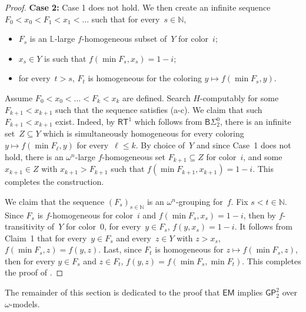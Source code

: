 \documentclass{article}
\numberwithin{theorem}{section}
\newtheorem{lemma}[theorem]{Lemma}
\def\LL{\mathbb{L}}
\def\L{\mathcal{L}}
\newcommand{\BSig}{\mathsf{B}\Sigma^0}
\newcommand{\EM}[0]{\mathsf{EM}}
\newcommand{\RT}[0]{\mathsf{RT}}
\newcommand{\GP}{\mathsf{GP}}
\newcommand{\NN}[0]{\mathbb{N}}
\begin{document}
\begin{proof}
\smallskip
\textbf{Case 2:} Case 1 does not hold. We then create an infinite sequence $F_0 < x_0 < F_1 < x_1 < \dots$ such that for every~$s \in \NN$,
\begin{itemize}
    \item[(a)] $F_s$ is an $\LL$-large $f$-homogeneous subset of~$Y$ for color~$i$;
    \item[(b)] $x_s \in Y$ is such that $f(\min F_s, x_s) = 1-i$;
    \item[(c)] for every~$t > s$, $F_t$ is homogeneous for the coloring $y \mapsto f(\min F_s, y)$.
\end{itemize}
Assume $F_0 < x_0 < \dots < F_k < x_k$ are defined. Search $H$-computably for some~$F_{k+1} < x_{k+1}$ such that the sequence satisfies (a-c). We claim that such $F_{k+1} < x_{k+1}$ exist. Indeed, by $\RT^1$ which follows from $\BSig_2$, there is an infinite set~$Z \subseteq Y$ which is simultaneously homogeneous for every coloring $y \mapsto f(\min F_\ell, y)$ for every~$\ell \leq k$. By choice of~$Y$ and since Case~1 does not hold, there is an $\omega^n$-large $f$-homogeneous set $F_{k+1} \subseteq Z$ for color~$i$, and some~$x_{k+1} \in Z$ with $x_{k+1} > F_{k+1}$ such that $f(\min F_{k+1}, x_{k+1}) = 1-i$. This completes the construction.

We claim that the sequence $(F_s)_{s \in \NN}$ is an $\omega^n$-grouping for~$f$. Fix $s < t \in \NN$. Since $F_s$ is $f$-homogeneous for color~$i$ and $f(\min F_s, x_s) = 1-i$, then by $f$-transitivity of~$Y$ for color~0, for every~$y \in F_s$, $f(y, x_s) = 1-i$. It follows from Claim~1 that for every~$y \in F_s$ and every~$z \in Y$ with $z > x_s$, $f(\min F_s, z) = f(y, z)$. Last, since $F_t$ is homogeneous for $z \mapsto f(\min F_s, z)$, then for every $y \in F_s$ and $z \in F_t$, $f(y, z) = f(\min F_s, \min F_t)$. This completes the proof of .
\end{proof}

The remainder of this section is dedicated to the proof that $\EM$ implies $\GP^2_2$ over $\omega$-models.

\end{document}
